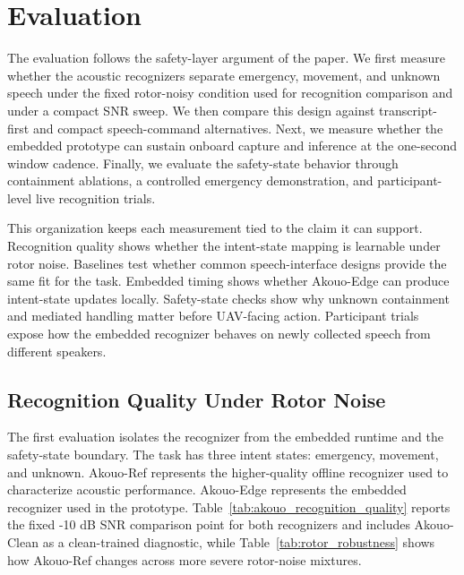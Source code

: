 \FloatBarrier
\section{Evaluation}
\label{sec:evaluation}

The evaluation follows the safety-layer argument of the paper. We first measure whether the acoustic recognizers separate emergency, movement, and unknown speech under the fixed rotor-noisy condition used for recognition comparison and under a compact SNR sweep. We then compare this design against transcript-first and compact speech-command alternatives. Next, we measure whether the embedded prototype can sustain onboard capture and inference at the one-second window cadence. Finally, we evaluate the safety-state behavior through containment ablations, a controlled emergency demonstration, and participant-level live recognition trials.

This organization keeps each measurement tied to the claim it can support. Recognition quality shows whether the intent-state mapping is learnable under rotor noise. Baselines test whether common speech-interface designs provide the same fit for the task. Embedded timing shows whether Akouo-Edge can produce intent-state updates locally. Safety-state checks show why unknown containment and mediated handling matter before UAV-facing action. Participant trials expose how the embedded recognizer behaves on newly collected speech from different speakers.

\subsection{Recognition Quality Under Rotor Noise}

The first evaluation isolates the recognizer from the embedded runtime and the safety-state boundary. The task has three intent states: emergency, movement, and unknown. Akouo-Ref represents the higher-quality offline recognizer used to characterize acoustic performance. Akouo-Edge represents the embedded recognizer used in the prototype. Table~\ref{tab:akouo_recognition_quality} reports the fixed -10 dB SNR comparison point for both recognizers and includes Akouo-Clean as a clean-trained diagnostic, while Table~\ref{tab:rotor_robustness} shows how Akouo-Ref changes across more severe rotor-noise mixtures.

